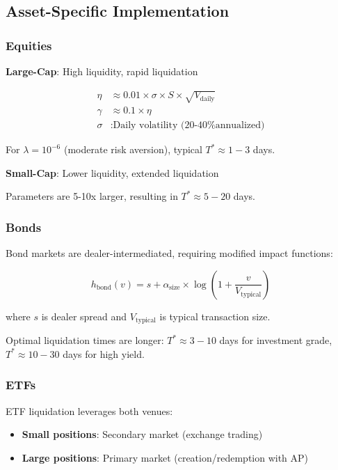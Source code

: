 \documentclass[11pt,a4paper]{article}
\begin{document}
\subsection{Asset-Specific Implementation}

\subsubsection{Equities}

\textbf{Large-Cap}: High liquidity, rapid liquidation

\begin{align*}
\eta &\approx 0.01 \times \sigma \times S \times \sqrt{V_{\text{daily}}} \\
\gamma &\approx 0.1 \times \eta \\
\sigma &: \text{Daily volatility (20-40\% annualized)}
\end{align*}

For $\lambda = 10^{-6}$ (moderate risk aversion), typical $T^* \approx 1-3$ days.

\textbf{Small-Cap}: Lower liquidity, extended liquidation

Parameters are 5-10x larger, resulting in $T^* \approx 5-20$ days.

\subsubsection{Bonds}

Bond markets are dealer-intermediated, requiring modified impact functions:

\begin{equation}
h_{\text{bond}}(v) = s + \alpha_{\text{size}} \times \log\left(1 + \frac{v}{V_{\text{typical}}}\right)
\end{equation}

where $s$ is dealer spread and $V_{\text{typical}}$ is typical transaction size.

Optimal liquidation times are longer: $T^* \approx 3-10$ days for investment grade, $T^* \approx 10-30$ days for high yield.

\subsubsection{ETFs}

ETF liquidation leverages both venues:

\begin{itemize}
    \item \textbf{Small positions}: Secondary market (exchange trading)
    \item \textbf{Large positions}: Primary market (creation/redemption with AP)
\end{itemize}
\end{document}
